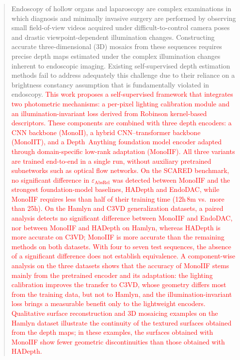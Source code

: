 \documentclass[a4paper,fleqn]{cas-dc}
\begin{document}
\maketitle
\begin{abstract}
%
Endoscopy of hollow organs and laparoscopy are complex examinations 
in which diagnosis and minimally invasive surgery are performed by observing small field-of-view videos acquired under difficult-to-control camera poses and drastic viewpoint-dependent illumination changes.  Constructing accurate three-dimensional (3D) mosaics from these sequences requires precise depth maps estimated under the complex illumination changes inherent to endoscopic imaging.  Existing self-supervised depth estimation methods fail to address adequately this challenge due to their reliance on a brightness constancy assumption that is fundamentally violated in endoscopy. \textcolor{red}{This work proposes a self-supervised framework that integrates two photometric mechanisms: a per-pixel lighting calibration module and an illumination-invariant loss derived from Robinson kernel-based descriptors. These components are combined with three depth encoders: a CNN backbone (MonoII), a hybrid CNN--transformer backbone (MonoIIT), and a Depth~Anything foundation model encoder adapted through domain-specific low-rank adaptation (MonoIIF). All three variants are trained end-to-end in a single run, without auxiliary pretrained subnetworks such as optical flow networks. On the SCARED benchmark, no significant difference in $\varepsilon_\textrm{AbsRel}$ was detected between MonoIIF and the strongest foundation-model baselines, HADepth and EndoDAC, while MonoIIF requires less than half of their training time (12h\,8m vs.\ more than 25h). On the Hamlyn and C3VD generalization datasets, a paired analysis detects no significant difference between MonoIIF and EndoDAC, nor between MonoIIF and HADepth on Hamlyn, whereas HADepth is more accurate on C3VD; MonoIIF is more accurate than the remaining methods on both datasets. With four to seven test sequences, the absence of a significant difference does not establish equivalence. A component-wise analysis on the three datasets shows that the accuracy of MonoIIF stems mainly from the pretrained encoder and its adaptation: the lighting calibration improves the transfer to C3VD, whose geometry differs most from the training data, but not to Hamlyn, and the illumination-invariant loss brings a measurable benefit only to the lightweight encoders. Qualitative surface reconstruction and 3D mosaicing examples on the Hamlyn dataset illustrate the continuity of the textured surfaces obtained from the depth maps; in these examples, the surfaces obtained with MonoIIF show fewer geometric discontinuities than those obtained with HADepth.}
\end{abstract}
\end{document}
